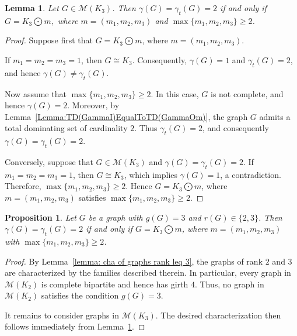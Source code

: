 \documentclass[12pt]{amsart}
\theoremstyle{plain}
\newtheorem{lemma}[theorem]{Lemma}
\newtheorem{proposition}[theorem]{Proposition}
\theoremstyle{definition}
\begin{document}
\begin{lemma}\label{lemma:rank-3-dn=tdn=2-iff}
Let $G\in\mathcal{M}(K_3)$. Then $\gamma(G)=\gamma_t(G)=2$ if and only if
$G=K_3\bigodot m,$
where $m=(m_1,m_2,m_3)$ and $\max\{m_1,m_2,m_3\}\geq2$.
\end{lemma}

\begin{proof}
Suppose first that $G=K_3\bigodot m$, where $m=(m_1,m_2,m_3)$.

If $m_1=m_2=m_3=1$, then $G\cong K_3$. Consequently,
$\gamma(G)=1$ and $\gamma_t(G)=2$, and hence
$\gamma(G)\neq\gamma_t(G)$.

Now assume that $\max\{m_1,m_2,m_3\}\geq2$. In this case, $G$ is not complete, and hence $\gamma(G)=2$. Moreover, by Lemma~\ref{Lemma:TD(GammaI)EqualToTD(GammaOm)}, the graph $G$ admits a total dominating set of cardinality $2$. Thus $\gamma_t(G)=2$, and consequently
$\gamma(G)=\gamma_t(G)=2$.

Conversely, suppose that $G\in\mathcal{M}(K_3)$ and
$\gamma(G)=\gamma_t(G)=2$. If $m_1=m_2=m_3=1$, then
$G\cong K_3$, which implies $\gamma(G)=1$, a contradiction.
Therefore, $\max\{m_1,m_2,m_3\}\geq2$. Hence
$G=K_3\bigodot m$, where $m=(m_1,m_2,m_3)$ satisfies
$\max\{m_1,m_2,m_3\}\geq2$.
\end{proof}



\begin{proposition}\label{prop:rank-2,3-d-td=2}
Let $G$ be a graph with $g(G)=3$ and $r(G)\in\{2,3\}$. Then
$\gamma(G)=\gamma_t(G)=2$ if and only if
$G=K_3\bigodot m$, where $m=(m_1,m_2,m_3)$ with $\max\{m_1,m_2,m_3\}\geq2$.
\end{proposition}

\begin{proof}
By Lemma~\ref{lemma: cha of graphs rank leq 3}, the graphs of rank
$2$ and $3$ are characterized by the families described therein. In
particular, every graph in $\mathcal{M}(K_2)$ is complete bipartite
and hence has girth $4$. Thus, no graph in $\mathcal{M}(K_2)$ satisfies
the condition $g(G)=3$.

It remains to consider graphs in $\mathcal{M}(K_3)$. The desired
characterization then follows immediately from
Lemma~\ref{lemma:rank-3-dn=tdn=2-iff}.
\end{proof}
\end{document}
